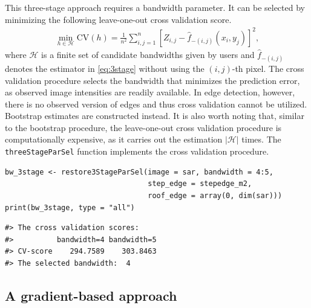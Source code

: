 This three-stage approach requires a bandwidth parameter. It can be selected by minimizing the following leave-one-out cross validation score.
\begin{align}
  \label{eq:loocv}
  \min_{h \in \mathscr{H}} \mathrm{CV}(h) = \frac{1}{n^2} \sum_{i, j = 1}^n \left[ Z_{i, j} - \widehat{f}_{-(i, j)}(x_i, y_j)\right]^2,
\end{align}
where \(\mathscr{H}\) is a finite set of candidate bandwidths given by users and \(\widehat{f}_{-(i, j)}\) denotes the estimator in \eqref{eq:3stage} without using the \((i, j)\)-th pixel. The cross validation procedure selects the bandwidth that minimizes the prediction error, as observed image intensities are readily available. In edge detection, however, there is no observed version of edges and thus cross validation cannot be utilized. Bootstrap estimates are constructed instead. It is also worth noting that, similar to the bootstrap procedure, the leave-one-out cross validation procedure is computationally expensive, as it carries out the estimation \(|\mathscr{H}|\) times. The \texttt{threeStageParSel} function implements the cross validation procedure.

\begin{verbatim}
bw_3stage <- restore3StageParSel(image = sar, bandwidth = 4:5, 
                                 step_edge = stepedge_m2, 
                                 roof_edge = array(0, dim(sar)))
print(bw_3stage, type = "all")
\end{verbatim}

\begin{verbatim}
#> The cross validation scores:
#>          bandwidth=4 bandwidth=5
#> CV-score    294.7589    303.8463
#> The selected bandwidth:  4
\end{verbatim}

\subsection{A gradient-based approach}\label{sec:denoise.grad}

